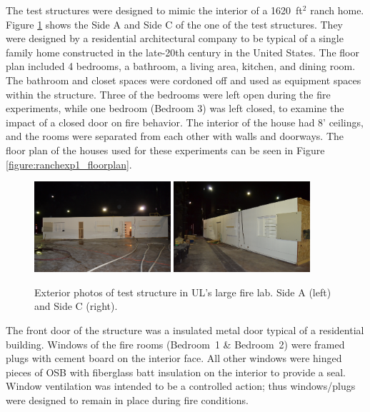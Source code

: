 \documentclass[12pt,oneside]{book}
\begin{document}
The test structures were designed to mimic the interior of a 1620~ft$^2$ ranch home. Figure \ref{fig:test_prop_photo} shows the Side A and Side C of the one of the test structures. They were designed by a residential architectural company to be typical of a single family home constructed in the late-20th century in the United States. The floor plan included 4 bedrooms, a bathroom, a living area, kitchen, and dining room. The bathroom and closet spaces were cordoned off and used as equipment spaces within the structure. Three of the bedrooms were left open during the fire experiments, while one bedroom (Bedroom 3) was left closed, to examine the impact of a closed door on fire behavior. The interior of the house had 8' ceilings, and the rooms were separated from each other with walls and doorways. The floor plan of the houses used for these experiments can be seen in Figure \ref{figure:ranchexp1_floorplan}.

\begin{figure}[H]
\centering
\includegraphics[width=0.45\textwidth]{0_Images/Ranch_Pictures/House_Front.jpg}
\includegraphics[width=0.45\textwidth]{0_Images/Ranch_Pictures/House_Rear.jpg}
\caption[Test Structure - Exterior Photos]{Exterior photos of test structure in UL's large fire lab. Side A (left) and Side C (right).}
\label{fig:test_prop_photo}
\end{figure}

The front door of the structure was a insulated metal door typical of a residential building. Windows of the fire rooms (Bedroom~1 \& Bedroom~2) were framed plugs with cement board on the interior face. All other windows were hinged pieces of OSB with fiberglass batt insulation on the interior to provide a seal. Window ventilation was intended to be a controlled action; thus windows/plugs were designed to remain in place during fire conditions. 
 
\end{document}
